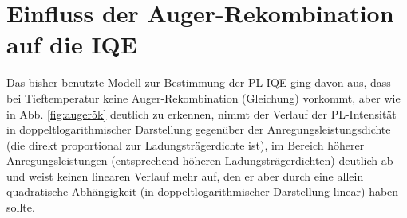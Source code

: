 
\chapter{Einfluss der Auger-Rekombination auf die IQE}
\label{chap:auger}
\thispagestyle{fancy}
Das bisher benutzte Modell zur Bestimmung der PL-IQE ging davon aus, dass bei Tieftemperatur keine Auger-Rekombination (Gleichung) vorkommt, aber wie in Abb. \ref{fig:auger5k} deutlich zu erkennen, nimmt der Verlauf der PL-Intensität in doppeltlogarithmischer Darstellung gegenüber der Anregungsleistungsdichte (die direkt proportional zur Ladungsträgerdichte ist), im Bereich höherer Anregungsleistungen (entsprechend höheren Ladungsträgerdichten) deutlich ab und weist keinen linearen Verlauf mehr auf, den er aber durch eine allein quadratische Abhängigkeit (in doppeltlogarithmischer Darstellung linear) haben sollte.
%
